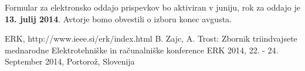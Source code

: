 \documentclass[a4paper]{article}
\begin{document}
Formular za elektronsko oddajo prispevkov bo aktiviran v juniju, rok za oddajo je \textbf{13. julij 2014}. Avtorje bomo obvestili o izboru konec avgusta.

\small
\begin{thebibliography}{1}

 ERK, http://www.ieee.si/erk/index.html 
 B. Zajc, A. Trost: Zbornik triindvajsete mednarodne Elektrotehniške in računalniške konference ERK 2014, 22. - 24. September 2014, Portorož, Slovenija

\end{thebibliography}
\end{document}
